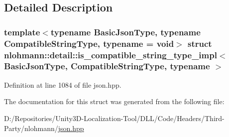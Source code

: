 \subsection{Detailed Description}
\subsubsection*{template$<$typename Basic\+Json\+Type, typename Compatible\+String\+Type, typename = void$>$\newline
struct nlohmann\+::detail\+::is\+\_\+compatible\+\_\+string\+\_\+type\+\_\+impl$<$ Basic\+Json\+Type, Compatible\+String\+Type, typename $>$}



Definition at line 1084 of file json.\+hpp.



The documentation for this struct was generated from the following file\+:\begin{DoxyCompactItemize}
\item 
D\+:/\+Repositories/\+Unity3\+D-\/\+Localization-\/\+Tool/\+D\+L\+L/\+Code/\+Headers/\+Third-\/\+Party/nlohmann/\mbox{\hyperlink{json_8hpp}{json.\+hpp}}\end{DoxyCompactItemize}
